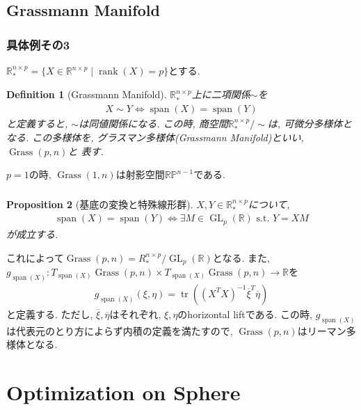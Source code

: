 \documentclass[dvipdfmx,11pt]{beamer}		%
\newtheorem{defi}{Definition}
\newtheorem{prop}[defi]{Proposition}
\newcommand{\R}{\mathbb{R}}
\begin{document}
    \subsection{Grassmann Manifold}
    \begin{frame}
        \frametitle{具体例その3}
        $\R^{n\times p}_* = \{X\in\R^{n\times p}\mid \operatorname{rank}(X) = p\}$とする. 
        \begin{defi}[Grassmann Manifold]
            $\R^{n\times p}_{*}$上に二項関係$\sim$を
            \begin{align*}
                X\sim Y \iff \operatorname{span}(X) = \operatorname{span}(Y)
            \end{align*}
            と定義すると, $\sim$は同値関係になる. この時, 商空間$\R^{n\times p }_{*}/\sim$は, 
            可微分多様体となる. この多様体を, グラスマン多様体(Grassmann Manifold)といい, $\operatorname{Grass}(p, n)$と
            表す. 
        \end{defi}
        $p = 1$の時, $\operatorname{Grass}(1, n)$は射影空間$\R\mathbb{P}^{n - 1}$である. 
    \end{frame}
    \begin{frame}
        \frametitle{}
        \begin{prop}[基底の変換と特殊線形群]
            $X, Y\in\R^{n\times p}_{*}$について, 
            \begin{align*}
                \operatorname{span}(X) = \operatorname{span}(Y)\iff \exists M\in \operatorname{GL}_p(\R)\text{ s.t. } Y = XM
            \end{align*}
            が成立する. 
        \end{prop}
        これによって$\operatorname{Grass}(p, n) = R^{n\times p}_{*}/\operatorname{GL}_p(\R)$となる. 
        また, $g_{\operatorname{span}(X)} : T_{\operatorname{span}(X)}\operatorname{Grass}(p, n)\times T_{\operatorname{span}(X)}\operatorname{Grass}(p, n)\to\R$を
        \begin{align*}
            g_{\operatorname{span}(X)}(\xi, \eta) = \operatorname{tr}\left(\left(X^{T} X\right)^{-1} \overline{\xi}^{T} \overline{\eta}\right)
        \end{align*}
        と定義する. ただし, $\overline{\xi}, \overline{\eta}$はそれぞれ, $\xi, \eta$のhorizontal liftである.
        この時, $g_{\operatorname{span}(X)}$は代表元のとり方によらず内積の定義を満たすので, $\operatorname{Grass}(p, n)$はリーマン多様体となる.
    \end{frame}
\section{Optimization on Sphere}
\end{document}
